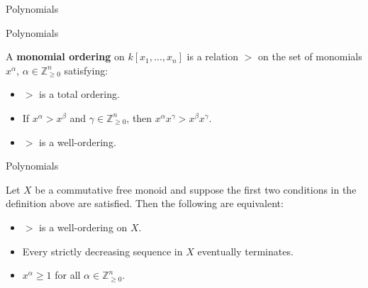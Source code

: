 \documentclass{beamer}
\def\bZ{\mathbb{Z}}
\begin{document}

\begin{frame}{Polynomials}
\end{frame}

\begin{frame}{Polynomials}
  \begin{definition}
    A \textbf{monomial ordering} on $k[x_1,\dots,x_n]$ is a relation $>$ on the set of monomials $x^\alpha$, $\alpha \in \bZ_{\ge0}^n$ satisfying:
    \begin{itemize}
      \item<2-> $>$ is a total ordering.
      \item<3-> If $x^\alpha > x^\beta$ and $\gamma \in \bZ_{\ge0}^n$, then $x^\alpha x^\gamma > x^\beta x^\gamma$.
      \item<4-> $>$ is a well-ordering.
    \end{itemize}
  \end{definition}
\end{frame}

\begin{frame}{Polynomials}
  \begin{theorem}
    Let $X$ be a commutative free monoid and suppose the first two conditions in the definition above are satisfied. Then the following are equivalent:
    \begin{itemize}
      \item<2-> $>$ is a well-ordering on $X$.
      \item<3-> Every strictly decreasing sequence in $X$ eventually terminates.
      \item<4-> $x^\alpha\ge1$ for all $\alpha \in \bZ_{\ge0}^n$.
    \end{itemize}
  \end{theorem}
\end{frame}
\end{document}
